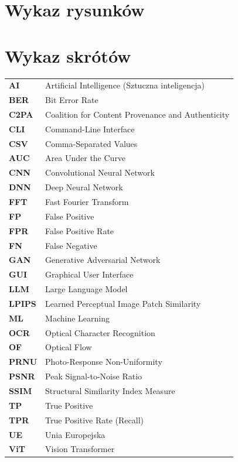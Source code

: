 \documentclass[pl,12pt,openany]{TAGH/t_agh_av}
\begin{document}
\chapter*{Wykaz rysunk\'{o}w}
\renewcommand{\listfigurename}{}
\listoffigures

\chapter*{Wykaz skr\'{o}t\'{o}w}
\begin{tabular}{ll}
\textbf{AI}    & Artificial Intelligence (Sztuczna inteligencja) \\
\textbf{BER}   & Bit Error Rate \\
\textbf{C2PA}  & Coalition for Content Provenance and Authenticity \\
\textbf{CLI}   & Command-Line Interface \\
\textbf{CSV}   & Comma-Separated Values \\
\textbf{AUC}   & Area Under the Curve \\
\textbf{CNN}   & Convolutional Neural Network \\
\textbf{DNN}   & Deep Neural Network \\
\textbf{FFT}   & Fast Fourier Transform \\
\textbf{FP}    & False Positive \\
\textbf{FPR}   & False Positive Rate \\
\textbf{FN}    & False Negative \\
\textbf{GAN}   & Generative Adversarial Network \\
\textbf{GUI}   & Graphical User Interface \\
\textbf{LLM}   & Large Language Model \\
\textbf{LPIPS} & Learned Perceptual Image Patch Similarity \\
\textbf{ML}    & Machine Learning \\
\textbf{OCR}   & Optical Character Recognition \\
\textbf{OF}    & Optical Flow \\
\textbf{PRNU}  & Photo-Response Non-Uniformity \\
\textbf{PSNR}  & Peak Signal-to-Noise Ratio \\
\textbf{SSIM}  & Structural Similarity Index Measure \\
\textbf{TP}    & True Positive \\
\textbf{TPR}   & True Positive Rate (Recall) \\
\textbf{UE}    & Unia Europejska \\
\textbf{ViT}   & Vision Transformer \\
\end{tabular}
\end{document}
